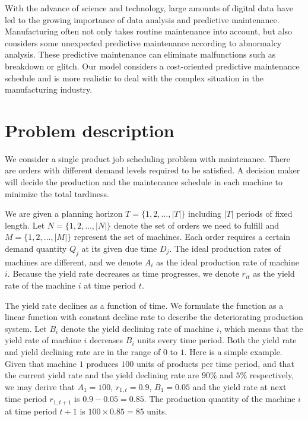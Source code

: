 \documentclass[12pt,a4page]{article}
\theoremstyle{definition}
\theoremstyle{remark}
\begin{document}
With the advance of science and technology, large amounts of digital data have led to the growing importance of data analysis and predictive maintenance. Manufacturing often not only takes routine maintenance into account, but also considers some unexpected predictive maintenance according to abnormalcy analysis. These predictive maintenance can eliminate malfunctions such as breakdown or glitch. Our model considers a cost-oriented predictive maintenance schedule and is more realistic to deal with the complex situation in the manufacturing industry.

\section{Problem description}

We consider a single product job scheduling problem with maintenance. There are orders with different demand levels required to be satisfied. A decision maker will decide the production and the maintenance schedule in each machine to minimize the total tardiness.

We are given a planning horizon $T = \{1, 2, ..., |T |\}$ including $|T|$ periods of fixed length. Let $N = \{1, 2, ..., |N|\}$ denote the set of orders we need to fulfill and $M =\{1, 2, ..., |M|\}$ represent the set of machines. Each order requires a certain demand quantity $Q_j$ at its given due time $D_j$. The ideal production rates of machines are different, and we denote $A_i$ as the ideal production rate of machine $i$. Because the yield rate decreases as time progresses, we denote $r_{it}$ as the yield rate of the machine $i$ at time period $t$.

The yield rate declines as a function of time. We formulate the function as a linear function with constant decline rate to describe the deteriorating production system. Let $B_i$ denote the yield declining rate of machine $i$, which means that the yield rate of machine $i$ decreases $B_i$ units every time period. Both the yield rate and yield declining rate are in the range of $0$ to $1$. Here is a simple example. Given that machine $1$ produces $100$ units of products per time period, and that the current yield rate and the yield declining rate are $90\%$ and $5\%$
respectively, we may derive that $A_1 = 100$, $r_{1,t} = 0.9$, $B_1 = 0.05$ and the yield rate at next time period $r_{1,t+1}$ is $0.9 - 0.05 = 0.85$. The production quantity of the machine $i$ at time period $t+1$ is $100 \times 0.85 = 85$ units.
\end{document}
